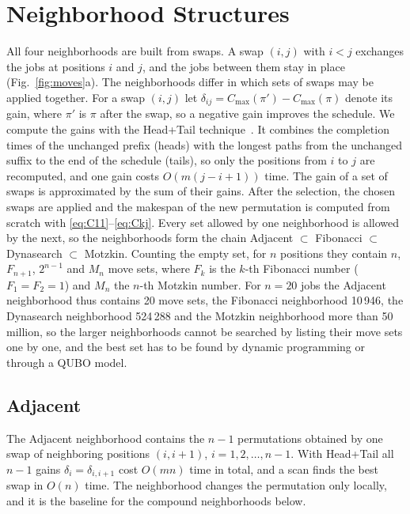 \documentclass[10pt,twoside,twocolumn,a4paper]{article}
\newif\ifrevmarks \revmarksfalse
\newcommand{\rev}[1]{\ifrevmarks\textcolor{red}{#1}\else#1\fi}
\newenvironment{revblock}{\ifrevmarks\color{red}\fi}{}
\begin{document}
\section{\rev{Neighborhood Structures}}\label{sec:neigh}
\begin{revblock}
All four neighborhoods are built from swaps. A swap $(i,j)$ with $i<j$ exchanges the jobs at positions $i$ and $j$, and the jobs between them stay in place (Fig.~\ref{fig:moves}a). The neighborhoods differ in which sets of swaps may be applied together. For a swap $(i,j)$ let $\delta_{ij}=C_{\max}(\pi')-C_{\max}(\pi)$ denote its gain, where $\pi'$ is $\pi$ after the swap, so a negative gain improves the schedule. We compute the gains with the Head+Tail technique~\cite{taillard1990some}. It combines the completion times of the unchanged prefix (heads) with the longest paths from the unchanged suffix to the end of the schedule (tails), so only the positions from $i$ to $j$ are recomputed, and one gain costs $O(m(j-i+1))$ time. The gain of a set of swaps is approximated by the sum of their gains. After the selection, the chosen swaps are applied and the makespan of the new permutation is computed from scratch with \eqref{eq:C11}--\eqref{eq:Ckj}. Every set allowed by one neighborhood is allowed by the next, so the neighborhoods form the chain Adjacent $\subset$ Fibonacci $\subset$ Dynasearch $\subset$ Motzkin. Counting the empty set, for $n$ positions they contain $n$, $F_{n+1}$, $2^{n-1}$ and $M_n$ move sets, where $F_k$ is the $k$-th Fibonacci number ($F_1=F_2=1$) and $M_n$ the $n$-th Motzkin number. For $n=20$ jobs the Adjacent neighborhood thus contains 20 move sets, the Fibonacci neighborhood 10\,946, the Dynasearch neighborhood 524\,288 and the Motzkin neighborhood more than 50 million, so the larger neighborhoods cannot be searched by listing their move sets one by one, and the best set has to be found by dynamic programming or through a QUBO model.
\end{revblock}

\subsection{\rev{Adjacent}}
\begin{revblock}
The Adjacent neighborhood contains the $n-1$ permutations obtained by one swap of neighboring positions $(i,i+1)$, $i=1,2,\dots,n-1$. With Head+Tail all $n-1$ gains $\delta_i=\delta_{i,i+1}$ cost $O(mn)$ time in total, and a scan finds the best swap in $O(n)$ time. The neighborhood changes the permutation only locally, and it is the baseline for the compound neighborhoods below.
\end{revblock}
\end{document}
